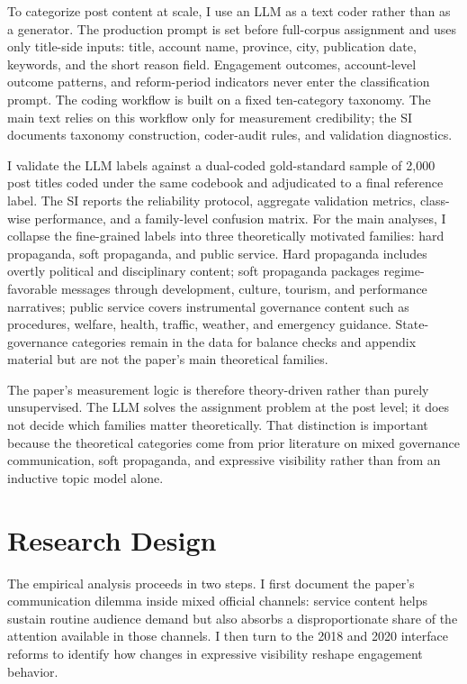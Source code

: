 \documentclass[12pt, american]{article}
\begin{document}
\begin{refsection}
To categorize post content at scale, I use an LLM as a text coder rather than as a generator. The production prompt is set before full-corpus assignment and uses only title-side inputs: title, account name, province, city, publication date, keywords, and the short reason field. Engagement outcomes, account-level outcome patterns, and reform-period indicators never enter the classification prompt. The coding workflow is built on a fixed ten-category taxonomy. The main text relies on this workflow only for measurement credibility; the SI documents taxonomy construction, coder-audit rules, and validation diagnostics.

I validate the LLM labels against a dual-coded gold-standard sample of 2,000 post titles coded under the same codebook and adjudicated to a final reference label. The SI reports the reliability protocol, aggregate validation metrics, class-wise performance, and a family-level confusion matrix. For the main analyses, I collapse the fine-grained labels into three theoretically motivated families: hard propaganda, soft propaganda, and public service. Hard propaganda includes overtly political and disciplinary content; soft propaganda packages regime-favorable messages through development, culture, tourism, and performance narratives; public service covers instrumental governance content such as procedures, welfare, health, traffic, weather, and emergency guidance. State-governance categories remain in the data for balance checks and appendix material but are not the paper's main theoretical families.

The paper's measurement logic is therefore theory-driven rather than purely unsupervised. The LLM solves the assignment problem at the post level; it does not decide which families matter theoretically. That distinction is important because the theoretical categories come from prior literature on mixed governance communication, soft propaganda, and expressive visibility rather than from an inductive topic model alone.

\section{Research Design}

The empirical analysis proceeds in two steps. I first document the paper's communication dilemma inside mixed official channels: service content helps sustain routine audience demand but also absorbs a disproportionate share of the attention available in those channels. I then turn to the 2018 and 2020 interface reforms to identify how changes in expressive visibility reshape engagement behavior.


\end{refsection}
\end{document}
